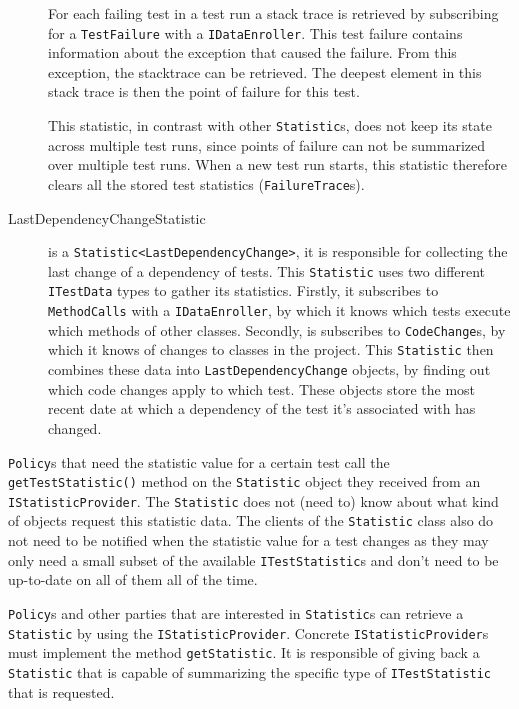 \documentclass[i2]{oss}
\newcommand{\class}[1]{\texttt{#1}}
\newcommand{\method}[1]{\texttt{#1}}
\begin{document}
\begin{description}
For each failing test in a test run a stack trace is retrieved by subscribing for a \class{TestFailure} with a \class{IDataEnroller}. This test failure contains information about the exception that caused the failure. From this exception, the stacktrace can be retrieved. The deepest element in this stack trace is then the point of failure for 
this test.

This statistic, in contrast
with other \class{Statistic}s, does not keep its state across multiple test runs, since points of failure can not be summarized over multiple test runs. When a new test run starts, this statistic therefore clears all the stored test statistics (\class{FailureTrace}s).

\item [LastDependencyChangeStatistic] is a \class{Statistic<LastDependencyChange>}, it is responsible for collecting the last change of a dependency of tests. This \class{Statistic} uses
two different \class{ITestData} types to gather its statistics.
Firstly, it subscribes to \class{MethodCalls} with a \class{IDataEnroller}, by which it knows which 
tests execute which methods of other classes.
Secondly, is subscribes to \class{CodeChange}s, by which it knows of changes to classes in the project.
This \class{Statistic} then combines these data into 
\class{LastDependencyChange} objects, by finding out which code changes apply to which test. These objects store the most recent date at which a dependency of the 
test it's associated with has changed.

\end{description}

\class{Policy}s that need the statistic value for a certain test call
the \method{getTestStatistic()} method on the \class{Statistic} object
they received from an \class{IStatisticProvider}.
The \class{Statistic} does not (need to) know about what kind of objects
request this statistic data.
The clients of the \class{Statistic} class also do not need to be 
notified when the statistic value for a test changes as they may only
need a small subset of the available \class{ITestStatistic}s and don't
need to be up-to-date on all of them all of the time.

\class{Policy}s and other parties that are interested in \class{Statistic}s can retrieve a \class{Statistic} by using the \class{IStatisticProvider}. Concrete \class{IStatisticProvider}s must implement the method \method{getStatistic}. It is responsible of giving back a \class{Statistic} that is capable of summarizing the specific type of \class{ITestStatistic} that is requested.
\end{document}

